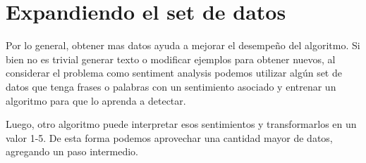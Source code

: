 
\section{Expandiendo el set de datos}

Por lo general, obtener mas datos ayuda a mejorar el desempe\~no del algoritmo. Si bien no es
trivial generar texto o modificar ejemplos para obtener nuevos, al considerar el problema como
sentiment analysis podemos utilizar alg\'un set de datos que tenga frases o palabras con un
sentimiento asociado y entrenar un algoritmo para que lo aprenda a detectar.

Luego, otro algoritmo puede interpretar esos sentimientos y transformarlos en un valor 1-5.
De esta forma podemos aprovechar una cantidad mayor de datos, agregando un paso intermedio. \cite{lexicons_db}
